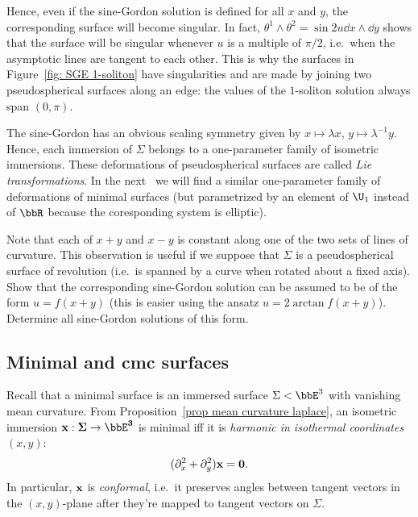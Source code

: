 Hence, even if the sine-Gordon solution is defined for all $x$ and $y$, the corresponding surface will become singular. In fact, $\theta^1\wedge\theta^2=\sin 2u \dd x\wedge \dd y$ shows that the surface will be singular whenever $u$ is a multiple of $\pi/2$, i.e.\ when the asymptotic lines are tangent to each other. This is why the surfaces in Figure~\ref{fig: SGE 1-soliton} have singularities and are made by joining two pseudospherical surfaces along an edge: the values of the $1$-soliton solution always span $(0,\pi)$.

\begin{rem}
    The sine-Gordon has an obvious scaling symmetry given by $x\mapsto \lambda x$, $y\mapsto \lambda^{-1}y$. Hence, each immersion of $\Sigma$ belongs to a one-parameter family of isometric immersions. These deformations of pseudospherical surfaces are called \emph{Lie transformations}. In the next \subsect\ we will find a similar one-parameter family of deformations of minimal surfaces (but parametrized by an element of $\U_1$ instead of $\bbR$ because the coresponding system is elliptic).
\end{rem}

\begin{xca}\label{xca 7.4.19 Ivey}
    Note that each of $x+y$ and $x-y$ is constant along one of the two sets of lines of curvature. 
    This observation is useful if we suppose that $\Sigma$ is a pseudospherical surface of revolution (i.e.\ is spanned by a curve when rotated about a fixed axis). Show that the corresponding sine-Gordon solution can be assumed to be of the form $u=f(x+y)$ (this is easier using the ansatz $u=2\arctan f(x+y)$). Determine all sine-Gordon solutions of this form. 
\end{xca}







\subsection{Minimal and \texorpdfstring{\gls{cmc}}{CMC} surfaces}

Recall that a minimal surface is an immersed surface $\Sigma<\bbE^3$ with vanishing mean curvature. From Proposition~\ref{prop mean curvature laplace}, an isometric immersion $\bf{x}:\Sigma\to \bbE^3$ is minimal iff it is \emph{harmonic in isothermal coordinates} $(x,y)$:
\[(\partial_x^2+\partial_y^2)\bf{x}=0.\]
In particular, $\bf{x}$ is \emph{conformal}, i.e.\ it preserves angles between tangent vectors in the $(x,y)$-plane after they're mapped to tangent vectors on $\Sigma$.


